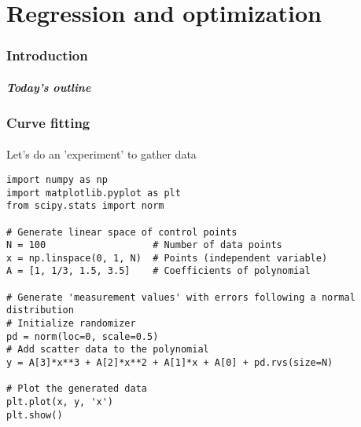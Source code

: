 \part{Regression and optimization}
\section{Introduction}
\subsection*{}
\begin{frame}[label=contents_opt]
  \frametitle{Today's outline}
\end{frame}


\section{Curve fitting}
\subsection*{}
\begin{frame}[fragile,label={slidedatacreate}]{Let's do an 'experiment' to gather data}
    \begin{lstlisting}
import numpy as np
import matplotlib.pyplot as plt
from scipy.stats import norm

# Generate linear space of control points
N = 100                   # Number of data points
x = np.linspace(0, 1, N)  # Points (independent variable)
A = [1, 1/3, 1.5, 3.5]    # Coefficients of polynomial

# Generate 'measurement values' with errors following a normal distribution
# Initialize randomizer
pd = norm(loc=0, scale=0.5)
# Add scatter data to the polynomial
y = A[3]*x**3 + A[2]*x**2 + A[1]*x + A[0] + pd.rvs(size=N)

# Plot the generated data
plt.plot(x, y, 'x')
plt.show()      
    \end{lstlisting}
\end{frame}

